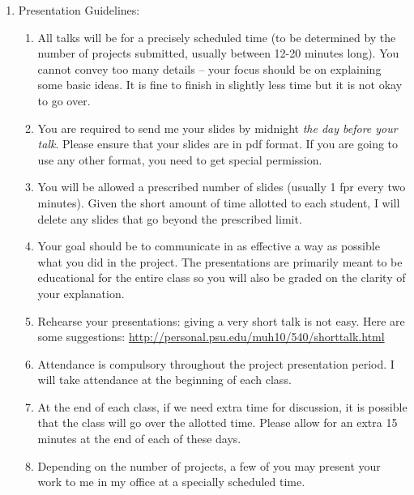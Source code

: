 \documentclass[10pts]{article}
\begin{document}
\begin{itemize}
\begin{enumerate}
\begin{enumerate}
  \end{enumerate}
\item Presentation Guidelines: 
\begin{enumerate}
\item All talks will be for a precisely scheduled time (to be
  determined by the number of projects submitted, usually between 12-20
  minutes long). You cannot convey too many details -- your focus
  should be on explaining some basic ideas. It is fine to finish in
  slightly less time but it is not okay to go
  over. %
\item You are required to send me your slides by midnight {\it the day before your talk}. Please ensure that your slides are in pdf format. If you are going to use any other format, you need to get special permission.
\item You will be allowed a prescribed number of slides (usually 1 fpr every two minutes).  Given the short amount of time allotted to each
  student, I will delete any slides that go beyond the prescribed limit.
\item Your goal should be to communicate in as effective a way as possible what you did in the project. The presentations are primarily meant to be educational for the entire class so you will also
 be graded on the clarity of your explanation.
\item Rehearse your presentations: giving a very short talk is not
  easy. Here are some suggestions: \url{http://personal.psu.edu/muh10/540/shorttalk.html}
\item Attendance is compulsory throughout the project presentation period. I will take attendance at the beginning of each class.
\item At the end of each class, if we need extra time for discussion, it is possible that the class will go over the allotted time. Please allow for an extra 15 minutes at the end of each
 of these days. 
\item Depending on the number of projects, a few of you may present your work to me in my office at a specially scheduled time.
\end{enumerate}
\end{enumerate}
\end{itemize}
\end{document}
